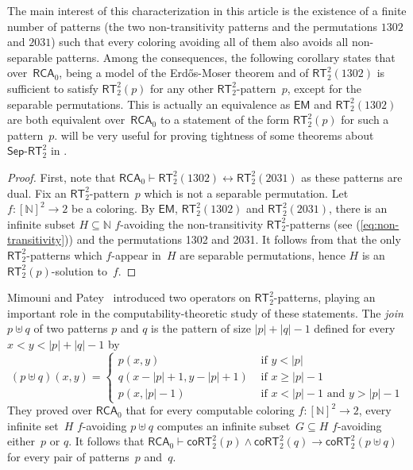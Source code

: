 \documentclass{article}
\numberwithin{theorem}{section}
\newtheorem{corollary}[theorem]{Corollary}
\newcommand{\RCA}[0]{\mathsf{RCA}}
\newcommand{\EM}[0]{\mathsf{EM}}
\newcommand{\RT}[0]{\mathsf{RT}}
\newcommand{\coRT}[0]{\mathsf{coRT}}
\newcommand{\SepRT}[0]{\mathsf{Sep}\mbox{-}\mathsf{RT}}
\newcommand{\NN}[0]{\mathbb{N}}
\begin{document}
The main interest of this characterization in this article is the existence of a finite number of patterns (the two non-transitivity patterns and the permutations $1302$ and $2031$) such that every coloring avoiding all of them also avoids all non-separable patterns.
Among the consequences, the following corollary states that over~$\RCA_0$, being a model of the Erd\H{o}s-Moser theorem and of $\RT^2_2(1302)$ is sufficient to satisfy $\RT^2_2(p)$ for any other $\RT^2_2$-pattern~$p$, except for the separable permutations. This is actually an equivalence as $\EM$ and $\RT^2_2(1302)$ are both equivalent over~$\RCA_0$ to a statement of the form $\RT^2_2(p)$ for such a pattern~$p$.  will be very useful for proving tightness of some theorems about $\SepRT^2_2$ in .

\begin{proof}
First, note that $\RCA_0 \vdash \RT^2_2(1302) \leftrightarrow \RT^2_2(2031)$ as these patterns are dual.
Fix an $\RT^2_2$-pattern~$p$ which is not a separable permutation.
Let $f : [\NN]^2 \to 2$ be a coloring. By $\EM$, $\RT^2_2(1302)$ and $\RT^2_2(2031)$, there is an infinite subset $H \subseteq \NN$ $f$-avoiding the non-transitivity $\RT^2_2$-patterns (see (\ref{eq:non-transitivity}))
and the permutations 1302 and 2031. It follows from  that the only $\RT^2_2$-patterns which $f$-appear in~$H$ are separable permutations, hence $H$ is an $\RT^2_2(p)$-solution to~$f$.
\end{proof}

Mimouni and Patey~\cite{mimouni2025ramseylike} introduced two operators on $\RT^2_2$-patterns, playing an important role in the computability-theoretic study of these statements. The \emph{join} $p \uplus q$ of two patterns $p$ and $q$ is the pattern of size $|p|+|q|-1$ defined for every~$x < y < |p|+|q|-1$ by
$$
(p \uplus q)(x, y) = \left\{ \begin{array}{ll}
    p(x, y) & \mbox{ if } y < |p|\\
    q(x-|p|+1, y-|p|+1) & \mbox{ if } x \geq |p|-1\\
    p(x, |p|-1) & \mbox{ if } x < |p|-1 \mbox{ and } y > |p|-1
\end{array}\right.
$$
They proved over $\RCA_0$ that for every computable coloring $f : [\NN]^2 \to 2$, every infinite set~$H$ $f$-avoiding $p \uplus q$ computes an infinite subset~$G \subseteq H$ $f$-avoiding either~$p$ or $q$. It follows that $\RCA_0 \vdash \coRT^2_2(p) \wedge \coRT^2_2(q) \to \coRT^2_2(p \uplus q)$ for every pair of patterns~$p$ and~$q$.
\end{document}
